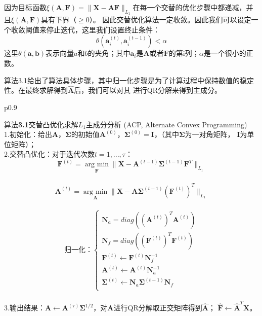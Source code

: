 因为目标函数$\xi (\bm{A},\bm F) = \|\bm X - \bm{A}\bm{F}\|_{L_1}$在每一个交替的优化步骤中都递减，并且$\xi( \bm{A},\bm F)$具有下界（$\geq 0$）。
因此交替优化算法一定收敛。因此我们可以设定一个收敛阈值来停止迭代，这里我们设置终止条件：
    $$ \theta(\bm a_i^{(t)}, \bm a_i^{(t-1)}) <  \alpha $$
这里$\theta(\bm a, \bm b)$表示向量$a$和$b$的夹角；其中$\bm a_i$是$\bm{A}$或者$\bm F$的第i列；$\alpha$是一个很小的正数。

算法3.1给出了算法具体步骤，其中归一化步骤是为了计算过程中保持数值的稳定性。在最终求解得到$\hat {\bm{A}}$后，我们可以对其
进行QR分解来得到主成分。

\begin{table}[H]%
    \centering%
    \begin{tabular}{{p{0.9\columnwidth}}}%
    
    \toprule%
    {\heiti 算法}{\bf 3.1}交替凸优化求解$L_1$主成分分析 (ACP, Alternate Convex Programming) \\
    \midrule%
    1.初始化：给出$\bm{A}$，$\bm \Sigma$的初始值$\bm{A}^{(0)}$，$\bm \Sigma^{(0)} = \bm I$，（其中$\bm \Sigma$为一对角矩阵，
    $\bm I$为单位矩阵）； \\

    2.交替凸优化：对于迭代次数$t = 1, ..., \tau$： \\
    $$ \bm F^{(t)} = \underset{\bm F}{\operatorname{arg\ min}} \|\bm X - \bm{A}^{(t-1)}\bm\Sigma^{(t-1)}\bm F^{T}\|_{L_1}$$ \\
    $$ \bm{A}^{(t)} = \underset{\bm{A}}{\operatorname{arg\ min}} \|\bm X - \bm{A}\bm\Sigma^{(t-1)}{(\bm F^{(t)})}^T \|_{L_1}$$ \\
    \begin{equation*}
        \text{归一化：}\left\{
                    \begin{array}{clr}
                    \bm N_a = diag({(\bm A^{(t)})}^T\bm{A}^{(t)})\\
                    \bm N_f = diag({(\bm F^{(t)})}^T\bm F^{(t)})\\
                    \bm F^{(t)} \leftarrow \bm F^{(t)}\bm N_f^{-1}\\
                    \bm{A}^{(t)}\leftarrow \bm{A}^{(t)}\bm N_a^{-1}\\
                    \bm \Sigma^{(t)} \leftarrow \bm N_a\bm \Sigma^{(t-1)}\bm N_f\\
                    \end{array}
        \right.
    \end{equation*} \\

    3.输出结果：$\bm{A} \leftarrow \bm{A}^{(\tau)}\bm \Sigma^{1/2}$，对$\bm{A}$进行QR分解取正交矩阵得到$\hat{\bm{A}}$；
    $\hat{\bm{F}} \leftarrow \hat{\bm{A}}^T\bm{X}$。 \\
    \bottomrule%
    \end{tabular}
\end{table}%

